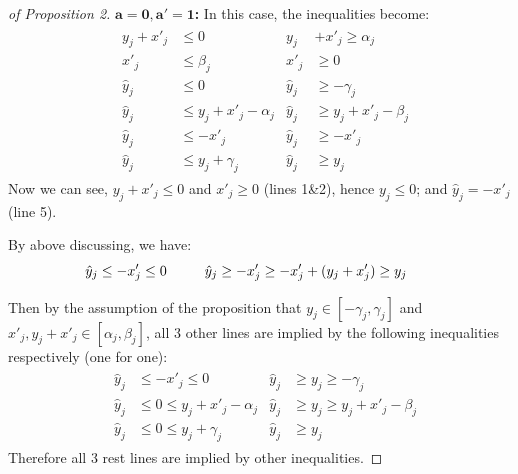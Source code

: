 \begin{proof}[of Proposition 2]
	
\textbf{$\mathbf{a = 0, a' = 1}$:}  In this case, the inequalities become: \begin{align*}
	& \begin{aligned}
		y_j + x'_j &\leq 0        &
		y_j &+ x'_j \geq \alpha_j \\
		x'_j       &\leq \beta_j       & 
		x'_j       &\geq 0 \\
		\hat{y}_j  &\leq 0      &
		\hat{y}_j  &\geq -\gamma_j \\
		\hat{y}_j  &\leq y_j + x'_j - \alpha_j &
		\hat{y}_j  &\geq y_j + x'_j  -\beta_j\\
		\hat{y}_j  &\leq -x'_j &
		\hat{y}_j  &\geq -x'_j \\
		\hat{y}_j  &\leq y_j + \gamma_j  &
		\hat{y}_j  &\geq y_j
	\end{aligned}
\end{align*} Now we can see, $y_j+x'_j\leq 0$ and $x'_j \geq 0$ (lines 1\&2), hence $y_j \leq 0$; and $\hat{y}_j= - x'_j$ (line 5). 

By above discussing,  we have: \begin{align*}
	& \begin{aligned}
		\hat{y}_j  &\leq -x'_j\leq 0      & \hspace*{4ex}
		\hat{y}_j  &\geq -x'_j \geq -x'_j+(y_j+x'_j) \geq y_j
	\end{aligned}
\end{align*}

Then by the assumption of the proposition that $y_j \in [-\gamma_j, \gamma_j]$ and $x'_j,y_j+x'_j \in [\alpha_j,\beta_j]$, all 3 other lines are implied by the following inequalities respectively (one for one):\begin{align*}
	& \begin{aligned}
		\hat{y}_j  &\leq -x'_j\leq 0      &
		\hat{y}_j  &\geq y_j\geq -\gamma_j \\
		\hat{y}_j  &\leq 0 \leq y_j + x'_j - \alpha_j &
		\hat{y}_j  &\geq y_j \geq y_j + x'_j -\beta_j \\
		\hat{y}_j  &\leq 0 \leq y_j + \gamma_j  &
		\hat{y}_j  &\geq  y_j
	\end{aligned}
\end{align*}Therefore all 3 rest lines are implied by other inequalities.





\end{proof}
